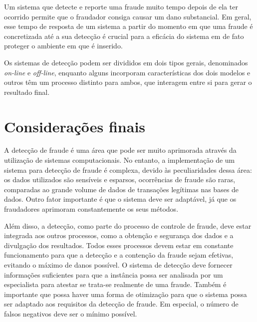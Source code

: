 Um sistema que detecte e reporte uma fraude muito tempo depois de ela ter ocorrido permite que o fraudador consiga causar um dano substancial. Em geral, esse tempo de resposta de um sistema a partir do momento em que uma fraude é concretizada até a sua detecção é crucial para a eficácia do sistema em de fato proteger o ambiente em que é inserido.

Os sistemas de detecção podem ser divididos em dois tipos gerais, denominados \emph{on-line} e \emph{off-line}, enquanto alguns incorporam características dos dois modelos e outros têm um processo distinto para ambos, que interagem entre si para gerar o resultado final.

\section{Considerações finais}

A detecção de fraude é uma área que pode ser muito aprimorada através da utilização de sistemas computacionais. No entanto, a implementação de um sistema para detecção de fraude é complexa, devido às peculiaridades dessa área: os dados utilizados são sensíveis e esparsos, ocorrências de fraude são raras, comparadas ao grande volume de dados de transações legítimas nas bases de dados. Outro fator importante é que o sistema deve ser adaptável, já que os fraudadores aprimoram constantemente os seus métodos.

Além disso, a detecção, como parte do processo de controle de fraude, deve estar integrada aos outros processos, como a obtenção e segurança dos dados e a divulgação dos resultados. Todos esses processos devem estar em constante funcionamento para que a detecção e a contenção da fraude sejam efetivas, evitando o máximo de danos possível. O sistema de detecção deve fornecer informações suficientes para que a instância possa ser analisada por um especialista para atestar se trata-se realmente de uma fraude. Também é importante que possa haver uma forma de otimização para que o sistema possa ser adaptado aos requisitos da detecção de fraude. Em especial, o número de falsos negativos deve ser o mínimo possível.

